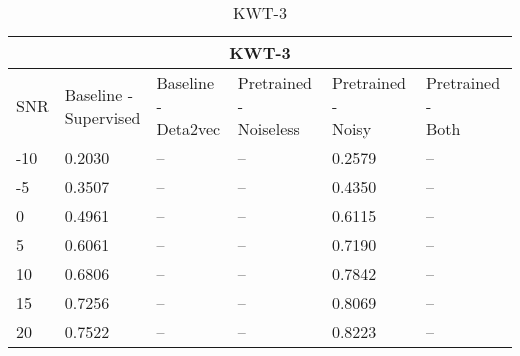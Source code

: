 \begin{table}[ht]
    \centering
    \begin{tabular}{@{}llllll@{}}
        \multicolumn{6}{c}{\textbf{KWT-3}}\\
        \toprule
        SNR    & \makecell{ Baseline - \\ Supervised } & \makecell{ Baseline - \\ Deta2vec } & \makecell{ Pretrained - \\ Noiseless } & \makecell{ Pretrained - \\ Noisy } & \makecell{ Pretrained - \\ Both } \\ \midrule
        -10  & 0.2030 & -- & -- & 0.2579 & -- \\
        -5   & 0.3507 & -- & -- & 0.4350 & -- \\
        0    & 0.4961 & -- & -- & 0.6115 & -- \\
        5    & 0.6061 & -- & -- & 0.7190 & -- \\
        10   & 0.6806 & -- & -- & 0.7842 & -- \\
        15   & 0.7256 & -- & -- & 0.8069 & -- \\
        20   & 0.7522 & -- & -- & 0.8223 & -- \\
        
        \bottomrule
    \end{tabular}
    \caption{KWT-3}
    \label{tab:KWT-3_snrmix_busxbblxcafxssn}
\end{table}

